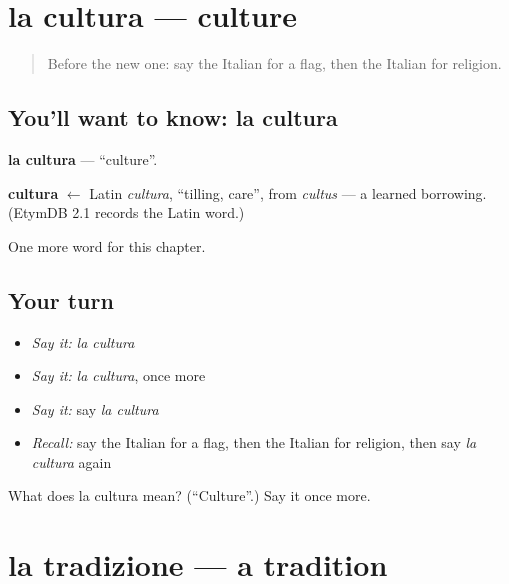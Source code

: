 \section[la cultura]{la cultura — culture}

\label{lesson:IT-C222-cultura}



\begin{quote}
Before the new one: say the Italian for a flag, then the Italian for religion.
\end{quote}

\subsection*{You'll want to know: la cultura}
\textbf{la cultura} — \textquotedblleft{}culture\textquotedblright{}.

\begin{cousinweb}
\textbf{cultura} $\leftarrow$ Latin \emph{cultura}, \textquotedblleft{}tilling, care\textquotedblright{}, from \emph{cultus} — a learned borrowing. (EtymDB 2.1 records the Latin word.)
\end{cousinweb}

\begin{grammarlens}[title={What you've built}]
One more word for this chapter.
\end{grammarlens}

\subsection*{Your turn}
\begin{itemize}
\raggedright
  \item \emph{Say it:} \emph{la cultura}
  \item \emph{Say it:} \emph{la cultura}, once more
  \item \emph{Say it:} say \emph{la cultura}
  \item \emph{Recall:} say the Italian for a flag, then the Italian for religion, then say \emph{la cultura} again
\end{itemize}

\begin{tcolorbox}[breakable,colback=teal!4,colframe=teal!35!black,title={Before you move on}]
What does la cultura mean? (\textquotedblleft{}Culture\textquotedblright{}.) Say it once more.
\end{tcolorbox}
\section[la tradizione]{la tradizione — a tradition}

